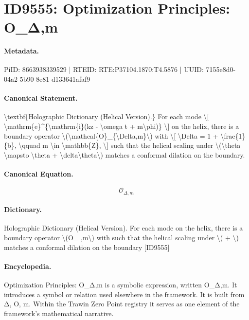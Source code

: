 \section*{ID9555: Optimization Principles: O\_Δ,m}
\paragraph{Metadata.}
PiID: 8663938339529 | RTEID: RTE:P37104.1870:T4.5876 | UUID: 7155e8d0-04a2-5b90-8e81-d133641afaf9

\paragraph{Canonical Statement.}
\textbackslash{}textbf\{Holographic Dictionary (Helical Version).\} For each mode \textbackslash{}[ \textbackslash{}mathrm\{e\}\textasciicircum{}\{\textbackslash{}mathrm\{i\}(kz - \textbackslash{}omega t + m\textbackslash{}phi)\} \textbackslash{}] on the helix, there is a boundary operator \textbackslash{}(\textbackslash{}mathcal\{O\}\_\{\textbackslash{}Delta,m\}\textbackslash{}) with \textbackslash{}[ \textbackslash{}Delta = 1 + \textbackslash{}frac\{1\}\{b\}, \textbackslash{}qquad m \textbackslash{}in \textbackslash{}mathbb\{Z\}, \textbackslash{}] such that the helical scaling under \textbackslash{}(\textbackslash{}theta \textbackslash{}mapsto \textbackslash{}theta + \textbackslash{}delta\textbackslash{}theta\textbackslash{}) matches a conformal dilation on the boundary.

\paragraph{Canonical Equation.}
\[
\mathcal{O}_{\Delta,m}
\]

\paragraph{Dictionary.}
Holographic Dictionary (Helical Version). For each mode on the helix, there is a boundary operator \textbackslash{}(O\_ ,m\textbackslash{}) with such that the helical scaling under \textbackslash{}( + \textbackslash{}) matches a conformal dilation on the boundary [ID9555]

\paragraph{Encyclopedia.}
Optimization Principles: O\_Δ,m is a symbolic expression, written O\_Δ,m. It introduces a symbol or relation used elsewhere in the framework. It is built from Δ, O, m. Within the Trawin Zero Point registry it serves as one element of the framework's mathematical narrative.
